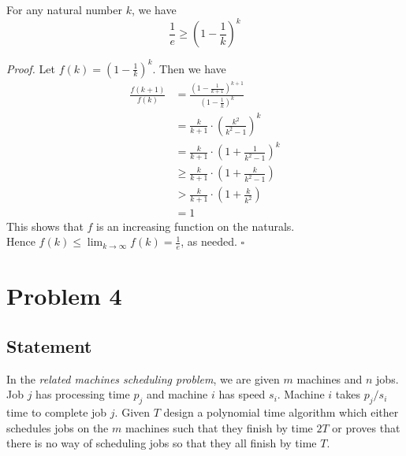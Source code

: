 \documentclass[a4paper]{article}
\newenvironment{proof}{\begin{breakbox}\textit{Proof.}}{\hfill$\square$\end{breakbox}}
\newcommand{\nl}{\vspace{0.2cm}\\}
\begin{document}
\begin{claim}
    For any natural number $k$, we have
    $$ \frac{1}{e} \ge \left(1 - \frac{1}{k}\right)^k $$
\end{claim}
\begin{proof}
    Let $f(k) = \left(1 - \frac{1}{k}\right)^k$. Then we have
    \begin{align*}
        \frac{f(k + 1)}{f(k)} &= \frac{\left(1 - \frac{1}{k + 1}\right)^{k+1}}{\left(1 - \frac{1}{k}\right)^k}\\
                              &= \frac{k}{k + 1} \cdot \left(\frac{k^2}{k^2 - 1}\right)^k\\
                              &= \frac{k}{k + 1} \cdot \left(1 + \frac{1}{k^2 - 1}\right)^k\\
                              &\ge \frac{k}{k + 1} \cdot \left(1 + \frac{k}{k^2 - 1}\right)\\
                              &> \frac{k}{k + 1} \cdot \left(1 + \frac{k}{k^2}\right)\\
                              &= 1
    \end{align*}
    This shows that $f$ is an increasing function on the naturals.\nl
    Hence $f(k) \le \lim_{k \to \infty} f(k) = \frac{1}{e}$, as needed.
\end{proof}

\newpage

\section{Problem 4}
\subsection{Statement}
In the \emph{related machines scheduling problem}, we are given $m$ machines and $n$ jobs. Job $j$ has processing time $p_j$ and machine $i$ has speed $s_i$.  Machine $i$ takes $p_j/s_i$ time to
complete job $j$. Given $T$ design a polynomial time algorithm which either schedules jobs on the $m$ machines such that they finish by time $2T$ or proves that there is no way of scheduling jobs so
that they all finish by time $T$.
\end{document}
